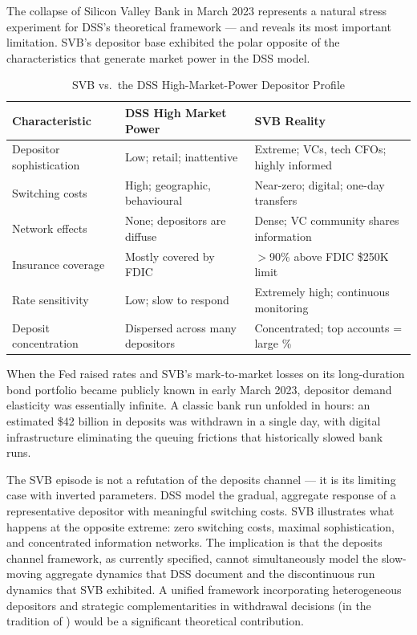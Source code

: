 \documentclass[12pt,a4paper]{article}
\begin{document}
The collapse of Silicon Valley Bank in March 2023 represents a natural
stress experiment for DSS's theoretical framework --- and reveals its most
important limitation. SVB's depositor base exhibited the polar opposite
of the characteristics that generate market power in the DSS model.

\begin{table}[H]
\centering
\caption{SVB vs.\ the DSS High-Market-Power Depositor Profile}
\label{tab:svb}
\small
\begin{tabular}{@{}p{3.4cm} p{4.9cm} p{4.9cm}@{}}
\toprule
\textbf{Characteristic} & \textbf{DSS High Market Power} &
  \textbf{SVB Reality} \\
\midrule
Depositor sophistication & Low; retail; inattentive &
  Extreme; VCs, tech CFOs; highly informed \\
Switching costs & High; geographic, behavioural &
  Near-zero; digital; one-day transfers \\
Network effects & None; depositors are diffuse &
  Dense; VC community shares information \\
Insurance coverage & Mostly covered by FDIC &
  $>$90\% above FDIC \$250K limit \\
Rate sensitivity & Low; slow to respond &
  Extremely high; continuous monitoring \\
Deposit concentration & Dispersed across many depositors &
  Concentrated; top accounts = large \% \\
\bottomrule
\end{tabular}
\end{table}

When the Fed raised rates and SVB's mark-to-market losses on its long-duration
bond portfolio became publicly known in early March 2023, depositor demand
elasticity was essentially infinite. A classic bank run unfolded in hours: an
estimated \$42 billion in deposits was withdrawn in a single day, with digital
infrastructure eliminating the queuing frictions that historically slowed bank
runs.

The SVB episode is not a refutation of the deposits channel --- it is its
limiting case with inverted parameters. DSS model the gradual, aggregate
response of a representative depositor with meaningful switching costs. SVB
illustrates what happens at the opposite extreme: zero switching costs, maximal
sophistication, and concentrated information networks. The implication is that
the deposits channel framework, as currently specified, cannot simultaneously
model the slow-moving aggregate dynamics that DSS document and the discontinuous
run dynamics that SVB exhibited. A unified framework incorporating heterogeneous
depositors and strategic complementarities in withdrawal decisions (in the
tradition of \citealt{diamond_dybvig_1983}) would be a significant theoretical
contribution.
\end{document}
